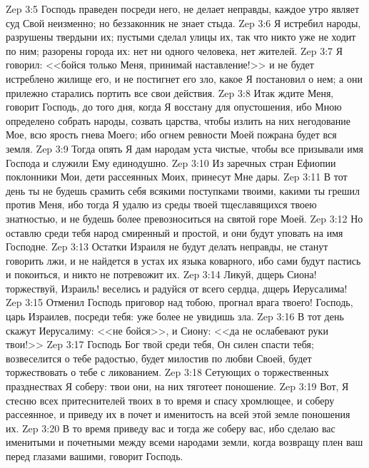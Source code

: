 \vs Zep 3:5 Господь праведен посреди него, не делает неправды, каждое утро являет суд Свой неизменно; но беззаконник не знает стыда.
\vs Zep 3:6 Я истребил народы, разрушены твердыни их; пустыми сделал улицы их, так что никто уже не ходит по ним; разорены города их: нет ни одного человека, нет жителей.
\vs Zep 3:7 Я говорил: <<бойся только Меня, принимай наставление!>> и не будет истреблено жилище его, и не постигнет его зло, какое Я постановил о нем; а они прилежно старались портить все свои действия.
\rsbpar\vs Zep 3:8 Итак ждите Меня, говорит Господь, до того дня, когда Я восстану для опустошения, ибо Мною определено собрать народы, созвать царства, чтобы излить на них негодование Мое, всю ярость гнева Моего; ибо огнем ревности Моей пожрана будет вся земля.
\vs Zep 3:9 Тогда опять Я дам народам уста чистые, чтобы все призывали имя Господа и служили Ему единодушно.
\vs Zep 3:10 Из заречных стран Ефиопии поклонники Мои, дети рассеянных Моих, принесут Мне дары.
\vs Zep 3:11 В тот день ты не будешь срамить себя всякими поступками твоими, какими ты грешил против Меня, ибо тогда Я удалю из среды твоей тщеславящихся твоею знатностью, и не будешь более превозноситься на святой горе Моей.
\vs Zep 3:12 Но оставлю среди тебя народ смиренный и простой, и они будут уповать на имя Господне.
\vs Zep 3:13 Остатки Израиля не будут делать неправды, не станут говорить лжи, и не найдется в устах их языка коварного, ибо сами будут пастись и покоиться, и никто не потревожит их.
\vs Zep 3:14 Ликуй, дщерь Сиона! торжествуй, Израиль! веселись и радуйся от всего сердца, дщерь Иерусалима!
\vs Zep 3:15 Отменил Господь приговор над тобою, прогнал врага твоего! Господь, царь Израилев, посреди тебя: уже более не увидишь зла.
\vs Zep 3:16 В тот день скажут Иерусалиму: <<не бойся>>, и Сиону: <<да не ослабевают руки твои!>>
\vs Zep 3:17 Господь Бог твой среди тебя, Он силен спасти тебя; возвеселится о тебе радостью, будет милостив по любви Своей, будет торжествовать о тебе с ликованием.
\vs Zep 3:18 Сетующих о торжественных празднествах Я соберу: твои они, на них тяготеет поношение.
\vs Zep 3:19 Вот, Я стесню всех притеснителей твоих в то время и спасу хромлющее, и соберу рассеянное, и приведу их в почет и именитость на всей этой земле поношения их.
\vs Zep 3:20 В то время приведу вас и тогда же соберу вас, ибо сделаю вас именитыми и почетными между всеми народами земли, когда возвращу плен ваш перед глазами вашими, говорит Господь.
